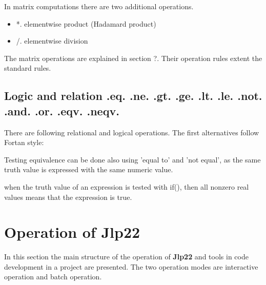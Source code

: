 {In matrix computations there are two additional operations. 
 
 
\begin{itemize} 
\item *. elementwise product (Hadamard product) 
\item /. elementwise division 
\end{itemize} 
 
 
The matrix operations are explained in section ?. Their operation rules extent 
the standard rules. 
\subsection{Logic and relation .eq. .ne. .gt. .ge. .lt. .le. .not. .and. .or. .eqv. .neqv.} 
\label{logic} 
There are following relational and logical operations. The first alternatives 
follow Fortan style: 
 
 
\begin{note} 
Testing equivalence can be done also using 'equal to' and 'not equal', as the same truth 
value is expressed with the same numeric value. 
\end{note} 
\begin{note} 
when the truth value of an expression is tested with \textcolor{VioletRed}{if}(), then all nonzero real values 
means that the expression is true. 
\end{note} 
 
 
\section{Operation of \textbf{Jlp22}} 
\label{joperation} 
In this section the main structure of the operation of \textbf{Jlp22} and tools 
in code development in a project are presented. 
The two operation modes are interactive operation and batch operation. 
}
